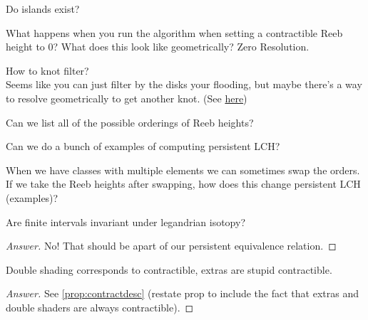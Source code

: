 \documentclass[General-Information/editedlog.tex]{subfiles}
\begin{document}
\begin{question}
    Do islands exist?
\end{question}

\begin{question}
    What happens when you run the algorithm when setting a contractible Reeb height to 0? What does this look like geometrically? Zero Resolution.
\end{question}

\begin{question}
    How to knot filter? \\
    Seems like you can just filter by the disks your flooding, but maybe there's a way to resolve geometrically to get another knot. (See \href{http://www.math.titech.ac.jp/~kalman/cobordism-talk.pdf}{here})
\end{question}



\begin{question}

Can we list all of the possible orderings of Reeb heights?
\end{question}

\begin{question}

Can we do a bunch of examples of computing persistent LCH?
\end{question}

\begin{question}
When we have classes with multiple elements we can sometimes swap the orders. If we take the Reeb heights after swapping, how does this change persistent LCH (examples)?
\end{question}

\begin{question}
Are finite intervals invariant under legandrian isotopy?
\end{question}
\begin{proof}[Answer]
    No! That should be apart of our persistent equivalence relation.
\end{proof}

\begin{question}
Double shading corresponds to contractible, extras are stupid contractible.
\end{question}
\begin{proof}[Answer]
    See \ref{prop:contractdesc} (\TODO restate prop to include the fact that extras and double shaders are always contractible).
\end{proof}
\end{document}
